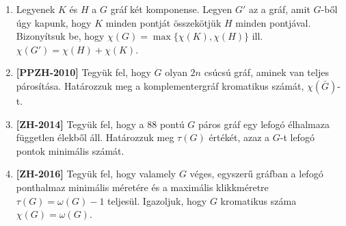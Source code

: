 \documentclass[a4paper, 12pt]{article}
\begin{document}
\begin{enumerate}
            
            \item Legyenek $K$ és $H$ a $G$ gráf két komponense. Legyen $G'$ az a gráf, amit $G$-ből úgy kapunk, hogy $K$ minden pontját összekötjük $H$ minden pontjával. Bizonyítsuk be, hogy $\chi(G)=\max\{\chi(K),\chi(H)\}$ ill. $\chi(G')=\chi(H)+\chi(K)$.
            
            \item \textbf{[PPZH-2010]} Tegyük fel, hogy $G$ olyan $2n$ csúcsú gráf, aminek van teljes párosítása. Határozzuk meg a komplementergráf kromatikus számát, $\chi(\bar{G})$-t.
            
            \item \textbf{[ZH-2014]} Tegyük fel, hogy a $88$ pontú $G$ páros gráf egy lefogó élhalmaza független élekből áll. Határozzuk meg $\tau(G)$ értékét, azaz a $G$-t lefogó pontok minimális számát.
            
            \item \textbf{[ZH-2016]} Tegyük fel, hogy valamely $G$ véges, egyszerű gráfban a lefogó ponthalmaz minimális méretére és a maximális klikkméretre $\tau(G)=\omega(G)-1$ teljesül. Igazoljuk, hogy $G$ kromatikus száma $\chi(G) = \omega(G)$.
            
            

\end{enumerate}
\end{document}
